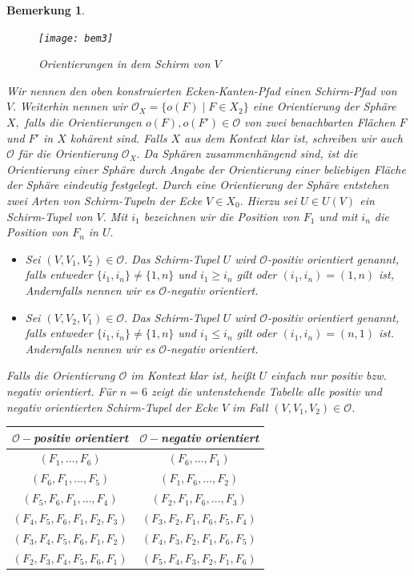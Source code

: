 \documentclass[12pt,titlepage,twoside,cleardoublepage]{article}
\theoremstyle{nummermitklammern}
\newtheorem{bemerkung}[temp]{Bemerkung}
\newtheorem{bemerkung}[zahl]{Bemerkung}
\numberwithin{equation}{section}
\begin{document}
\begin{bemerkung}
\begin{figure}[H]
\begin{center}
\texttt{[image: bem3]}
\end{center}
\caption{Orientierungen in dem Schirm von $V$}
\end{figure}
Wir nennen den oben konstruierten Ecken-Kanten-Pfad einen \emph{Schirm-Pfad} von $V.$
Weiterhin nennen wir $\mathcal{O}_X=\{o(F)\mid F\in X_2\}$ eine Orientierung der Sphäre $X,$ falls die Orientierungen $o(F),o(F')\in \mathcal{O}$ von zwei benachbarten Flächen $F$ und $F'$ in $X$ kohärent sind. Falls $X$ aus dem Kontext klar ist, schreiben wir auch $\mathcal{O}$ für die Orientierung $\mathcal{O}_X.$ Da Sphären zusammenhängend sind, ist die  Orientierung einer Sphäre durch Angabe der Orientierung einer beliebigen Fläche der Sphäre eindeutig festgelegt. Durch eine Orientierung der Sphäre  entstehen zwei Arten von Schirm-Tupeln der Ecke $V\in X_0.$ Hierzu sei $U\in U(V)$ ein Schirm-Tupel von $V.$ Mit $i_1$ bezeichnen wir die Position von $F_1$ und mit $i_n$ die Position von $F_n$ in $U.$
\begin{itemize}
\item Sei
$(V,V_1,V_2)\in \mathcal{O}.$ Das Schirm-Tupel $U$ wird $\mathcal{O}$-\emph{positiv orientiert} genannt, falls entweder $\{i_1,i_n\}\neq\{1,n\}$ und $i_1\geq i_n$ gilt oder $(i_1,i_n)=(1,n)$ ist,  Andernfalls nennen wir es $\mathcal{O}$-\emph{negativ orientiert}.
\item Sei $(V,V_2,V_1)\in \mathcal{O}.$ Das Schirm-Tupel $U$ wird $\mathcal{O}$-\emph{positiv orientiert} genannt, falls entweder $\{i_1,i_n\}\neq \{1,n\}$ und $i_1\leq i_n$ gilt oder $(i_1,i_n)=(n,1)$ ist. Andernfalls nennen wir es $\mathcal{O}$-\emph{negativ orientiert}.
 \end{itemize}
Falls die Orientierung $\mathcal{O}$ im Kontext klar ist, heißt $U$ einfach nur positiv bzw. negativ orientiert.
Für $n=6$ zeigt die untenstehende Tabelle alle positiv und negativ orientierten Schirm-Tupel der Ecke $V$ im Fall $(V,V_1,V_2) \in \mathcal{O}$.\\
\begin{center}
\begin{tabular}{|c|c|}
\hline
$\mathcal{O}-$positiv orientiert & $\mathcal{O}-$negativ orientiert\\
\hline
$(F_1,\ldots,F_6)$&$(F_6,\ldots ,F_1)$\\
$(F_6,F_1,\ldots,F_5)$&$(F_1,F_6,\ldots ,F_2)$\\
$(F_5,F_6,F_1,\ldots,F_4)$&$(F_2,F_1,F_6,\ldots,F_3)$\\
$(F_4,F_5,F_6,F_1,F_2,F_3)$&$(F_3,F_2,F_1,F_6,F_5,F_4)$\\
$(F_3,F_4,F_5,F_6,F_1,F_2)$&$(F_4,F_3,F_2,F_1,F_6,F_5)$\\
$(F_2,F_3,F_4,F_5,F_6,F_1)$&$(F_5,F_4,F_3,F_2,F_1,F_6)$\\
\hline
\end{tabular}
\end{center}
\end{bemerkung}
  
\end{document}
